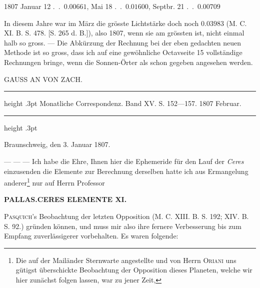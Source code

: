 \begin{center}
1807 Januar 12 .\ .\ $0.00661$,\qquad
Mai 18 .\ .\ $0.01600$,\qquad
Septbr. 21 .\ .\ $0.00709$
\end{center}

\par\indent In diesem Jahre war im März die grösste Lichtstärke doch noch $0.03983$ (M. C. XI. B. S. 478. [S. 265
d. B.]), also 1807, wenn sie am grössten ist, nicht einmal halb so gross. --- Die Abkürzung der Rechnung bei der eben gedachten neuen Methode ist so gross, dass ich auf eine gewöhnliche Octavseite 15
vollständige Rechnungen bringe, wenn die Sonnen-Örter als schon gegeben angesehen werden.

\par{}

\par\bigskip
{}
\begin{center}
\large GAUSS AN VON ZACH.
\end{center}

\begin{center}
\parbox{.76\linewidth}{%
\centering\fontsize{8.2}{10.2}\selectfont
\hrule height .3pt\relax\vspace{2.5pt}
Monatliche Correspondenz. Band XV. S. 152—157. 1807 Februar.\par
\vspace{2.5pt}\hrule height .3pt\relax
}
\end{center}

\begin{flushright}
Braunschweig, den 3. Januar 1807.
\end{flushright}

\par\indent --- --- --- Ich habe die Ehre, Ihnen hier die Ephemeride für den Lauf der \emph{Ceres} einzusenden
die Elemente zur Berechnung derselben hatte ich aus Ermangelung anderer\footnote{Die auf der Mailänder Sternwarte angestellte und von Herrn \textsc{Oriani} uns gütigst überschickte Beobachtung der Opposition dieses Planeten, welche wir hier zunächst folgen lassen, war zu jener Zeit,} nur auf Herrn Professor
\par
\clearpage
\thispagestyle{empty}
\noindent{}%
\makebox[12mm][l]{}%
\parbox[t]{\dimexpr\linewidth-24mm\relax}{\centering\footnotesize\bfseries PALLAS.\enspace CERES ELEMENTE XI.\par}%
\par\nobreak\medskip
\noindent \textsc{Pasquich}'s Beobachtung der letzten Opposition (M. C. XIII. B. S. 192; XIV. B. S. 92.) gründen
können, und muss mir also ihre fernere Verbesserung bis zum Empfang zuverlässigerer vorbehalten.
Es waren folgende:

